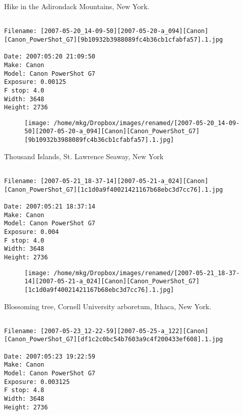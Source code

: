 \clearpage
\onecolumn
\noindent Hike in the Adirondack Mountains, New York.
\noindent
\begin{lstlisting}

Filename: [2007-05-20_14-09-50][2007-05-20-a_094][Canon][Canon_PowerShot_G7][9b10932b3988089fc4b36cb1cfabfa57].1.jpg

Date: 2007:05:20 21:09:50
Make: Canon
Model: Canon PowerShot G7
Exposure: 0.00125
F stop: 4.0
Width: 3648
Height: 2736
\end{lstlisting}
\clearpage

\begin{figure}
\texttt{[image: /home/mkg/Dropbox/images/renamed/[2007-05-20\_14-09-50][2007-05-20-a\_094][Canon][Canon\_PowerShot\_G7][9b10932b3988089fc4b36cb1cfabfa57].1.jpg]}
\end{figure}
    
\clearpage
\onecolumn
\noindent Thousand Islands, St. Lawrence Seaway, New York
\noindent
\begin{lstlisting}

Filename: [2007-05-21_18-37-14][2007-05-21-a_024][Canon][Canon_PowerShot_G7][1c1d0a9f40021421167b68ebc3d7cc76].1.jpg

Date: 2007:05:21 18:37:14
Make: Canon
Model: Canon PowerShot G7
Exposure: 0.004
F stop: 4.0
Width: 3648
Height: 2736
\end{lstlisting}
\clearpage

\begin{figure}
\texttt{[image: /home/mkg/Dropbox/images/renamed/[2007-05-21\_18-37-14][2007-05-21-a\_024][Canon][Canon\_PowerShot\_G7][1c1d0a9f40021421167b68ebc3d7cc76].1.jpg]}
\end{figure}
    
\clearpage
\onecolumn
\noindent Blossoming tree, Cornell University arboretum, Ithaca, New York.
\noindent
\begin{lstlisting}

Filename: [2007-05-23_12-22-59][2007-05-25-a_122][Canon][Canon_PowerShot_G7][df1c2c0bc54b7603a9c4f200433ef608].1.jpg

Date: 2007:05:23 19:22:59
Make: Canon
Model: Canon PowerShot G7
Exposure: 0.003125
F stop: 4.8
Width: 3648
Height: 2736
\end{lstlisting}
\clearpage

